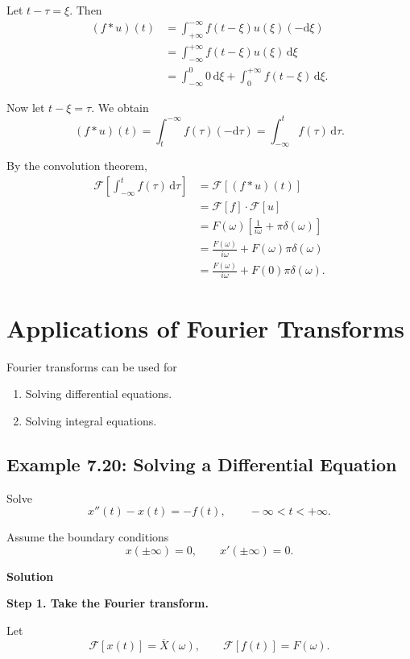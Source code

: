 \documentclass[11pt,a4paper]{article}
\theoremstyle{definition}
\theoremstyle{plain}
\begin{document}
Let \(t-\tau=\xi\). Then
\[
\begin{aligned}
(f*u)(t)
&=\int_{+\infty}^{-\infty}
f(t-\xi)u(\xi)(-\mathrm d\xi)\\
&=\int_{-\infty}^{+\infty}
f(t-\xi)u(\xi)\,\mathrm d\xi\\
&=\int_{-\infty}^{0}0\,\mathrm d\xi
+\int_0^{+\infty}f(t-\xi)\,\mathrm d\xi.
\end{aligned}
\]

Now let \(t-\xi=\tau\). We obtain
\[
(f*u)(t)
=\int_t^{-\infty}f(\tau)(-\mathrm d\tau)
=\int_{-\infty}^{t}f(\tau)\,\mathrm d\tau.
\]

By the convolution theorem,
\[
\begin{aligned}
\mathcal F\!\left[
\int_{-\infty}^{t}f(\tau)\,\mathrm d\tau
\right]
&=\mathcal F[(f*u)(t)]\\
&=\mathcal F[f]\cdot\mathcal F[u]\\
&=F(\omega)
\left[\frac1{i\omega}+\pi\delta(\omega)\right]\\
&=\frac{F(\omega)}{i\omega}
+F(\omega)\pi\delta(\omega)\\
&=\frac{F(\omega)}{i\omega}
+F(0)\pi\delta(\omega).
\end{aligned}
\]

\section{Applications of Fourier Transforms}

Fourier transforms can be used for

\begin{enumerate}
\item
  Solving differential equations.

\item
  Solving integral equations.

\end{enumerate}

\subsection{Example 7.20: Solving a Differential Equation}

Solve
\[
x''(t)-x(t)=-f(t),
\qquad -\infty<t<+\infty.
\]

Assume the boundary conditions
\[
x(\pm\infty)=0,
\qquad
x'(\pm\infty)=0.
\]

\textbf{Solution}\par\nopagebreak[4]
\textbf{Step 1. Take the Fourier transform.}\par\nopagebreak[4]
Let
\[
\mathcal F[x(t)]=\overline X(\omega),
\qquad
\mathcal F[f(t)]=F(\omega).
\]
\end{document}
